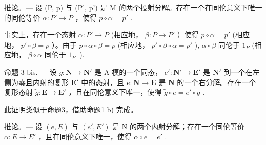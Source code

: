 推论。--- 设 (P, p) 与 (P', p') 是 M 的两个投射分解。存在一个在同伦意义下唯一的同伦等价 \(\alpha: P' \to P\) ，使得 \(p \circ \alpha = p'\) .

事实上，存在一个态射 \(\alpha: P' \to P\) (相应地， \(\beta: P \to P'\) ）使得 \(p \circ \alpha = p'\) (相应地， \(p' \circ \beta = p\) ）。由于 \(p \circ \alpha \circ \beta = p\) (相应地， \(p' \circ \beta \circ \alpha = p'\) ), \(\alpha \circ \beta\) 同伦于 \(1_P\) (相应地， \(\beta \circ \alpha\) 同伦于 \(1_{P'}\) ).

命题 3 bis. --- 设 \(g: \mathbf{N} \to \mathbf{N}'\) 是 A-模的一个同态， \(e': \mathbf{N}' \to \mathbf{E}'\) 是 \(\mathbf{N}'\) 到一个在左侧为零且内射的复形 \(\mathbf{E}'\) 中的态射，且 \(e: \mathbf{N} \to \mathbf{E}\) 是 \(\mathbf{N}\) 的一个右分解。存在一个复形态射 \(\tilde{g}: \mathbf{E} \to \mathbf{E}'\) ，且在同伦意义下唯一，使得 \(\tilde{g} \circ e = e' \circ g\) .

此证明类似于命题3，借助命题1 b) 完成。

推论。--- 设 \((e, E)\) 与 \((e', E')\) 是 N 的两个内射分解；存在一个同伦等价 \(\alpha : E \to E'\) ，且在同伦意义下唯一，使得 \(\alpha \circ e = e'\) .

